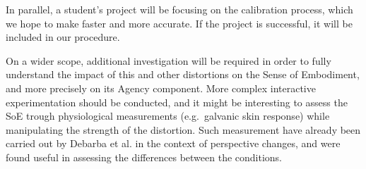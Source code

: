 In parallel, a student's project will be focusing on the calibration process, which we hope to make faster and more accurate. If the project is successful, it will be included in our procedure.

On a wider scope, additional investigation will be required in order to fully understand the impact of this and other distortions on the Sense of Embodiment, and more precisely on its Agency component. More complex interactive experimentation should be conducted, and it might be interesting to assess the SoE trough physiological measurements (e.g.\ galvanic skin response) while manipulating the strength of the distortion. Such measurement have already been carried out by Debarba et al. \cite{debarba2017perspective} in the context of perspective changes, and were found useful in assessing the differences between the conditions.